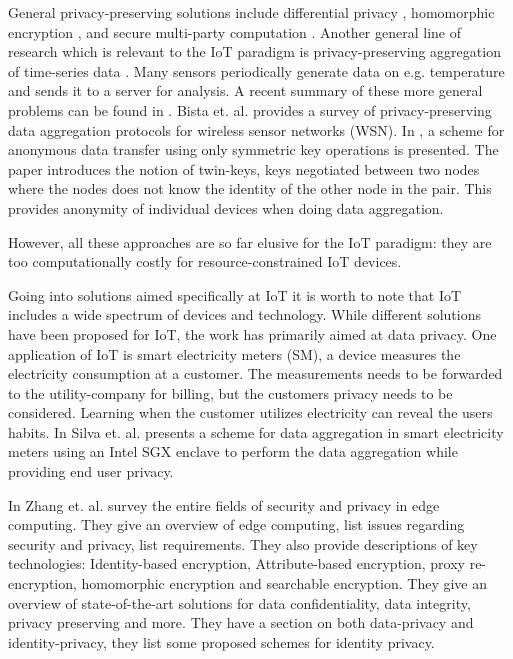 {General privacy-preserving solutions include differential privacy \cite{DworkMNS06}, homomorphic encryption \cite{gentry2009fully}\cite{naehrig2011can}, and secure multi-party computation \cite{bringer2013privacy}. %
Another general line of research which is relevant to the IoT paradigm is privacy-preserving aggregation of time-series data \cite{JoyeL13} \cite{BenhamoudaJL16} \cite{EmuraKOS18} \cite{ShiCRCS11}. Many sensors periodically generate data on e.g. temperature and sends it to a server for analysis. A recent summary of these more general problems can be found in \cite{shan2018practical}. Bista et. al. provides a survey of privacy-preserving data aggregation protocols for wireless sensor networks (WSN). In \cite{conti2009privacy}, a scheme for anonymous data transfer using only symmetric key operations is presented. The paper introduces the notion of twin-keys, keys negotiated between two nodes where the nodes does not know the identity of the other node in the pair. This provides anonymity of individual devices when doing data aggregation.

However, all these approaches are so far elusive for the IoT paradigm: they are too computationally costly for resource-constrained IoT devices.  

Going into solutions aimed specifically at IoT it is worth to note that IoT includes a wide spectrum of devices and technology. While different solutions have been proposed for IoT, the work has primarily aimed at data privacy. 
One application of IoT is smart electricity meters (SM), a device measures the electricity consumption at a customer. The measurements needs to be forwarded to the utility-company for billing, but the customers privacy needs to be considered. Learning when the customer utilizes electricity can reveal the users habits. In \cite{Silva:2017:SPP:3019612.3019795} Silva et. al. presents a scheme for data aggregation in smart electricity meters using an Intel SGX enclave to perform the data aggregation while providing end user privacy. 

In \cite{zhang2018data} Zhang et. al. survey the entire fields of security and privacy in edge computing. They give an overview of edge computing, list issues regarding security and privacy, list requirements. They also provide descriptions of key technologies: Identity-based encryption, Attribute-based encryption, proxy re-encryption, homomorphic encryption and searchable encryption. They give an overview of state-of-the-art solutions for data confidentiality, data integrity, privacy preserving and more. They have a section on both data-privacy and identity-privacy, they list some proposed schemes for identity privacy.

}
